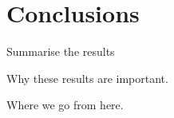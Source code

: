 \section{Conclusions}
Summarise the results

Why these results are important.

Where we go from here.
